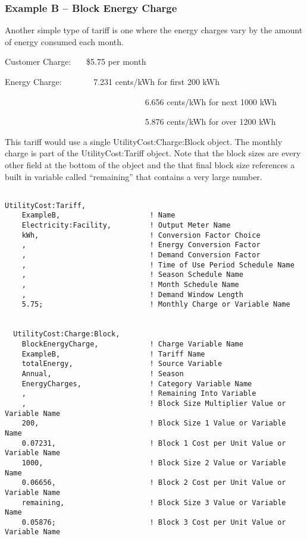 \subsubsection{Example B -- Block Energy Charge}\label{example-b-block-energy-charge}

Another simple type of tariff is one where the energy charges vary by the amount of energy consumed each month.

Customer Charge:~~~ \$5.75 per month

Energy Charge:~~~~~~~ 7.231 cents/kWh for first 200 kWh

~~~~~~~~~~~~~~~~~~~~~~~~~~~~~~~~~ 6.656 cents/kWh for next 1000 kWh

~~~~~~~~~~~~~~~~~~~~~~~~~~~~~~~~~ 5.876 cents/kWh for over 1200 kWh

This tariff would use a single UtilityCost:Charge:Block object. The monthly charge is part of the UtilityCost:Tariff object. Note that the block sizes are every other field at the bottom of the object and the that final block size references a built in variable called ``remaining'' that contains a very large number.

\begin{lstlisting}

UtilityCost:Tariff,
    ExampleB,                     ! Name
    Electricity:Facility,         ! Output Meter Name
    kWh,                          ! Conversion Factor Choice
    ,                             ! Energy Conversion Factor
    ,                             ! Demand Conversion Factor
    ,                             ! Time of Use Period Schedule Name
    ,                             ! Season Schedule Name
    ,                             ! Month Schedule Name
    ,                             ! Demand Window Length
    5.75;                         ! Monthly Charge or Variable Name


  UtilityCost:Charge:Block,
    BlockEnergyCharge,            ! Charge Variable Name
    ExampleB,                     ! Tariff Name
    totalEnergy,                  ! Source Variable
    Annual,                       ! Season
    EnergyCharges,                ! Category Variable Name
    ,                             ! Remaining Into Variable
    ,                             ! Block Size Multiplier Value or Variable Name
    200,                          ! Block Size 1 Value or Variable Name
    0.07231,                      ! Block 1 Cost per Unit Value or Variable Name
    1000,                         ! Block Size 2 Value or Variable Name
    0.06656,                      ! Block 2 Cost per Unit Value or Variable Name
    remaining,                    ! Block Size 3 Value or Variable Name
    0.05876;                      ! Block 3 Cost per Unit Value or Variable Name
\end{lstlisting}


